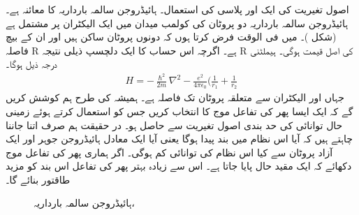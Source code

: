  اصول تغیریت کی ایک اور پلاسی کی استعمال۔ ہائیڈروجن سالمہ بارداریہ   کا معائنہ ہے۔ ہائیڈروجن سالمہ بارداریہ دو پروٹان کی کولمب میدان میں ایک الیکٹران پر مشتمل ہے (شکل )۔ 
میں فی الوقت فرض کرتا ہوں کہ دونوں پروٹان ساکن ہیں اور ان کے بیچ فاصلہ R ہے۔ اگرچہ اس حساب کا ایک دلچسپ ذیلی نتیجہ R کی اصل قیمت ہوگی۔ ہیملٹنی درجہ ذیل ہوگا۔
 \begin{align}
H=-\frac{\hslash^{2}}{2m}\nabla^{2}-\frac{e^{2}}{4\pi\epsilon_{0}}(\frac{1}{r_{1}}+\frac{1}{r_{2}} 
\end{align}
 جہاں  اور   الیکٹران سے متعلقہ پروٹان تک فاصلہ ہے۔ ہمیشہ کی طرح ہم کوشش کریں گے کہ ایک ایسا پھر کی تفاعل موج کا انتخاب کریں جس کو استعمال کرتے ہوئے زمینی حال توانائی کی حد بندی اصول تغیریت سے حاصل ہو۔ در حقیقت ہم صرف اتنا جاننا چاہتے ہیں کہ آیا اس نظام میں بند پیدا ہوگا یعنی آیا ایک معادل ہائیڈروجن جوہر اور ایک آزاد پروٹان سے کیا اس نظام کی توانائی کم ہوگی۔ اگر ہماری پھر کی تفاعل موج دکھائے کہ ایک مقید حال پایا جاتا ہے۔ اس سے زیادہ بہتر پھر کی تفاعل اس بند کو مزید طاقتور بنائے گا۔
\begin{figure} \centering
{} 
\caption{ہائیڈروجن سالمہ بارداریہ، } 
\label{شکل_تغیریت_ہائیڈروجن_سالمہ_بارداریہ} 
\end{figure} 

